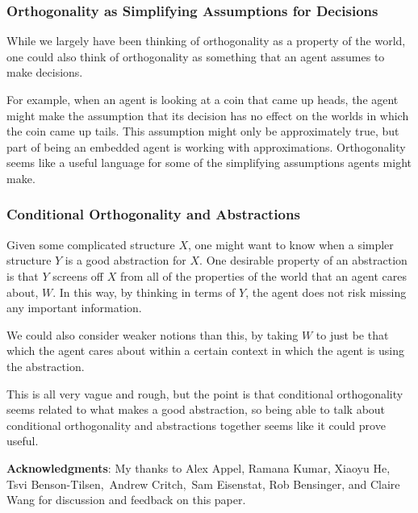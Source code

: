 \documentclass[authordate,onecolumn]{miri-tech-article}
\begin{document}
\subsubsection{Orthogonality as Simplifying Assumptions for Decisions}
While we largely have been thinking of orthogonality as a property of the world, one could also think of orthogonality as something that an agent assumes to make decisions.

For example, when an agent is looking at a coin that came up heads, the agent might make the assumption that its decision has no effect on the worlds in which the coin came up tails. This assumption might only be approximately true, but part of being an embedded agent is working with approximations. Orthogonality seems like a useful language for some of the simplifying assumptions agents might make.

\subsubsection{Conditional Orthogonality and Abstractions}
Given some complicated structure $X$, one might want to know when a simpler structure $Y$ is a good abstraction for $X$. One desirable property of an abstraction is that $Y$ screens off $X$ from all of the properties of the world that an agent cares about, $W$. In this way, by thinking in terms of $Y$, the agent does not risk missing any important information.

We could also consider weaker notions than this, by taking $W$ to just be that which the agent cares about within a certain context in which the agent is using the abstraction. 

This is all very vague and rough, but the point is that conditional orthogonality seems related to what makes a good abstraction, so being able to talk about conditional orthogonality and abstractions together seems like it could prove useful.

\vspace{13mm}

\noindent
\textbf{Acknowledgments}: My thanks to Alex Appel, Ramana Kumar, Xiaoyu He, Tsvi Benson-Tilsen, Andrew Critch, Sam Eisenstat, Rob Bensinger, and Claire Wang for discussion and feedback on this paper.

\pagebreak 

\printbibliography
\end{document}
